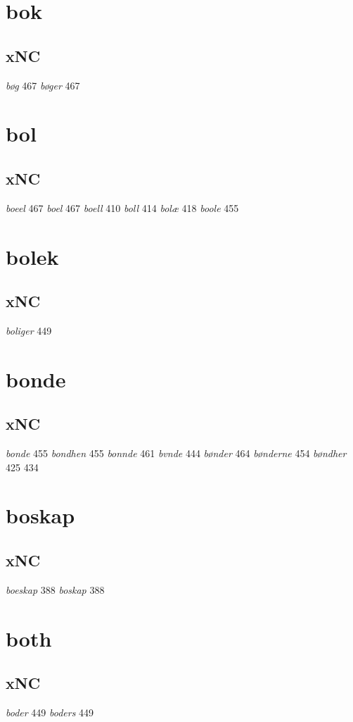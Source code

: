 \documentclass[a4paper,twocolumn]{article}
\begin{document}
\section{bok}
\label{sec:orgab664a6}
\subsection{xNC}
\label{sec:org70d3241}
\emph{bøg} 467 \emph{bøger} 467 
\section{bol}
\label{sec:orgbaf1ecd}
\subsection{xNC}
\label{sec:org2b7bfa4}
\emph{boeel} 467 \emph{boel} 467 \emph{boell} 410 \emph{boll} 414 \emph{bolæ} 418 \emph{boole} 455 
\section{bolek}
\label{sec:org7a6f33a}
\subsection{xNC}
\label{sec:org43f8e7b}
\emph{boliger} 449 
\section{bonde}
\label{sec:org4350013}
\subsection{xNC}
\label{sec:org6c9c289}
\emph{bonde} 455 \emph{bondhen} 455 \emph{bonnde} 461 \emph{bvnde} 444 \emph{bønder} 464 \emph{bønderne} 454 \emph{bøndher} 425 434 
\section{boskap}
\label{sec:orgf2f7ff8}
\subsection{xNC}
\label{sec:orgbabe51a}
\emph{boeskap} 388 \emph{boskap} 388 
\section{both}
\label{sec:org5ba7e04}
\subsection{xNC}
\label{sec:orgb6b265d}
\emph{boder} 449 \emph{boders} 449 
\end{document}
